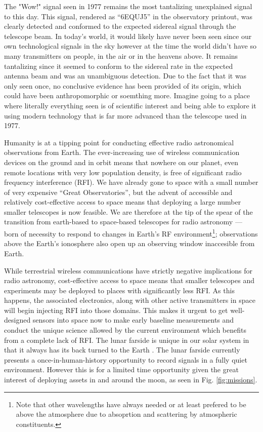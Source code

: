 The "Wow!" signal seen in 1977 \citep{wow} remains the most tantalizing unexplained signal to this day.  This signal, rendered as ``6EQUJ5'' in the observatory printout, was clearly detected and conformed to the expected sidereal signal through the telescope beam.  In today's world, it would likely have never been seen since our own technological signals in the sky however at the time the world didn't have so many transmitters on people, in the air or in the heavens above.  It remains tantalizing since it seemed to conform to the sidereal rate in the expected antenna beam and was an unambiguous detection. Due to the fact that it was only seen once, no conclusive evidence has been provided of its origin, which could have been anthropomorphic or soemthing more. Imagine going to a place where literally everything seen is of scientific interest and being able to explore it using modern technology that is far more advanced than the telescope used in 1977.   

Humanity is at a tipping point for conducting effective radio astronomical observations from Earth. The ever-increasing use of wireless communication devices on the ground and in orbit means that nowhere on our planet, even remote locations with very low population density, is free of significant radio frequency interference (RFI). We have already gone to space with a small number of very expensive ``Great Observatories'', but the advent of accessible and relatively cost-effective access to space means that deploying a large number smaller telescopes is now feasible. We are therefore at the tip of the spear of the transition from earth-based to space-based telescopes for radio astronomy --- born of necessity to respond to changes in Earth’s RF environment\footnote{Note that other wavelengths have always needed or at least prefered to be above the atmosphere due to absoprtion and scattering by atmospheric constituents.}; observations above the Earth's ionosphere also open up an observing window inaccesible from Earth.

While terrestrial wireless communications have strictly negative implications for radio astronomy, cost-effective access to space means that smaller telescopes and experiments may be deployed to places with significantly less RFI. As this happens, the associated electronics, along with other active transmitters in space will begin injecting RFI into those domains. This makes it urgent to get well-designed sensors into space now to make early baseline measurements and conduct the unique science allowed by the current environment which benefits from a complete lack of RFI. The lunar farside is unique in our solar system in that it always has its back turned to the Earth \citep{MACCONE2019233,michaud2020lunar,heidmann2002}. The lunar farside currently presents a once-in-human-history opportunity to record signals in a fully quiet environment. However this is for a limited time opportunity given the great interest of deploying assets in and around the moon, as seen in Fig. \ref{fig:missions}.

